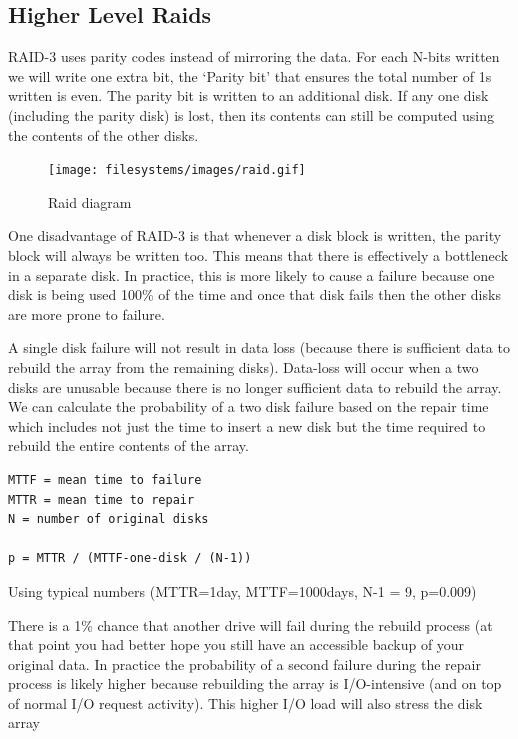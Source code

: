 \subsection{Higher Level Raids}

RAID-3 uses parity codes instead of mirroring the data. For each N-bits written we will write one extra bit, the `Parity bit' that ensures the total number of 1s written is even. The parity bit is written to an additional disk. If any one disk (including the parity disk) is lost, then its contents can still be computed using the contents of the other disks.

\begin{figure}[htbp]
\centering
\texttt{[image: filesystems/images/raid.gif]}
\caption{Raid diagram}
\end{figure}

One disadvantage of RAID-3 is that whenever a disk block is written, the parity block will always be written too. This means that there is effectively a bottleneck in a separate disk. In practice, this is more likely to cause a failure because one disk is being used 100\% of the time and once that disk fails then the other disks are more prone to failure.

A single disk failure will not result in data loss (because there is sufficient data to rebuild the array from the remaining disks). Data-loss will occur when a two disks are unusable because there is no longer sufficient data to rebuild the array. We can calculate the probability of a two disk failure based on the repair time which includes not just the time to insert a new disk but the time required to rebuild the entire contents of the array.

\begin{verbatim}
MTTF = mean time to failure
MTTR = mean time to repair
N = number of original disks

p = MTTR / (MTTF-one-disk / (N-1))
\end{verbatim}

Using typical numbers (MTTR=1day, MTTF=1000days, N-1 = 9, p=0.009)

There is a 1\% chance that another drive will fail during the rebuild process (at that point you had better hope you still have an accessible backup of your original data. In practice the probability of a second failure during the repair process is likely higher because rebuilding the array is I/O-intensive (and on top of normal I/O request activity). This higher I/O load will also stress the disk array


